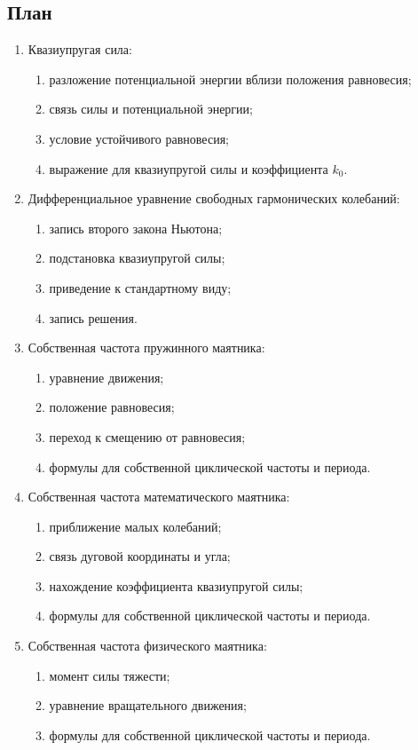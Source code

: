 \documentclass[a4paper,12pt]{article}
\begin{document}
\subsection*{План}
\begin{enumerate}
    \item Квазиупругая сила:
    \begin{enumerate}
        \item разложение потенциальной энергии вблизи положения равновесия;
        \item связь силы и потенциальной энергии;
        \item условие устойчивого равновесия;
        \item выражение для квазиупругой силы и коэффициента $k_0$.
    \end{enumerate}
    \item Дифференциальное уравнение свободных гармонических колебаний:
    \begin{enumerate}
        \item запись второго закона Ньютона;
        \item подстановка квазиупругой силы;
        \item приведение к стандартному виду;
        \item запись решения.
    \end{enumerate}
    \item Собственная частота пружинного маятника:
    \begin{enumerate}
        \item уравнение движения;
        \item положение равновесия;
        \item переход к смещению от равновесия;
        \item формулы для собственной циклической частоты и периода.
    \end{enumerate}
    \item Собственная частота математического маятника:
    \begin{enumerate}
        \item приближение малых колебаний;
        \item связь дуговой координаты и угла;
        \item нахождение коэффициента квазиупругой силы;
        \item формулы для собственной циклической частоты и периода.
    \end{enumerate}
    \item Собственная частота физического маятника:
    \begin{enumerate}
        \item момент силы тяжести;
        \item уравнение вращательного движения;
        \item формулы для собственной циклической частоты и периода.
    \end{enumerate}
\end{enumerate}
\end{document}
